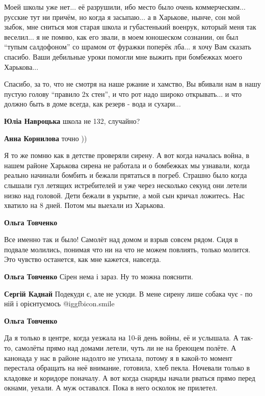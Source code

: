 \begin{itemize}
Моей школы уже нет... её разрушили, ибо место было очень коммерческим...
русские тут ни причём, но когда я засыпаю... а в Харькове, нынче, сон мой
зыбок, мне сниться моя старая школа и губастенький военрук, который меня так
веселил... я не помню, как его звали, в моем юношеском сознании, он был \enquote{тупым
салдофоном} со шрамом от фуражки поперёк лба... я хочу Вам сказать спасибо.
Ваши дебильные уроки помогли мне выжить при бомбежках моего Харькова...

Спасибо, за то, что не смотря на наше ржание и хамство, Вы вбивали нам в нашу
пустую голову \enquote{правило 2х стен}, и что рот надо широко открывать... и что
должно быть в доме всегда, как резерв - вода и сухари...

\begin{itemize} %
\textbf{Юліа Навроцька} школа не 132, случайно?

\textbf{Анна Корнилова} точно ))
\end{itemize} %


Я то же помню как в детстве проверяли сирену. А вот когда началась война, в
нашем районе Харькова сирена не работала и о бомбежках мы узнавали, когда
реально начинали бомбить и бежали прятаться в погреб. Страшно было когда
слышали гул летящих истребителей и уже через несколько секунд они летели низко
над головой. Дети бежали в укрытие, а мой сын кричал ложитесь. Нас хватило на 8
дней. Потом мы выехали из Харькова.

\begin{itemize} %
\textbf{Ольга Товченко} 

Все именно так и было! Самолёт над домом и взрыв совсем рядом. Сидя в подвале
молились, понимая что ни на что не можем повлиять, только молится. Это чувство
останется, как мне кажется, навсегда.

\textbf{Ольга Товченко} Сірен нема і зараз. Ну то можна пояснити.

\textbf{Сергій Каднай} Подекуди є, але не усюди. В мене сирену лише собака чує - по ній і орієнтуємось  @igg{fbicon.smile} 

\textbf{Ольга Товченко} 

Да я только в центре, когда уезжала на 10-й день войны, её и услышала. А
так-то, самолёты прямо над домами летели, чуть ли не на бреющем полёте. А
канонада у нас в районе надолго не утихала, потому я в какой-то момент
перестала обращать на неё внимание, готовила, хлеб пекла. Ночевали только в
кладовке и коридоре поначалу. А вот когда снаряды начали рваться прямо перед
окнами, уехали. А муж оставался. Пока в него осколок не прилетел.


\end{itemize}
\end{itemize}
